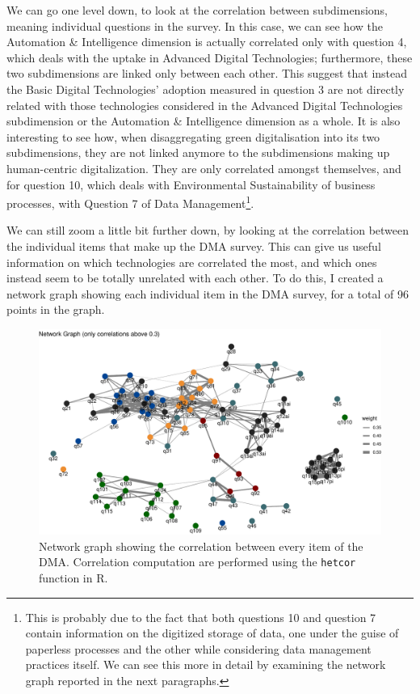 \documentclass[12pt]{report}
\begin{document}
\par We can go one level down, to look at the correlation between subdimensions, meaning individual questions in the survey. In this case, we can see how the Automation \& Intelligence dimension is actually correlated only with question 4, which deals with the uptake in Advanced Digital Technologies; furthermore, these two subdimensions are linked only between each other. This suggest that instead the Basic Digital Technologies' adoption measured in question 3 are not directly related with those technologies considered in the Advanced Digital Technologies subdimension or the Automation \& Intelligence dimension as a whole. It is also interesting to see how, when disaggregating green digitalisation into its two subdimensions, they are not linked anymore to the subdimensions making up human-centric digitalization. They are only correlated amongst themselves, and for question 10, which deals with Environmental Sustainability of business processes, with Question 7 of Data Management\footnote{This is probably due to the fact that both questions 10 and question 7 contain information on the digitized storage of data, one under the guise of paperless processes and the other while considering data management practices itself. We can see this more in detail by examining the network graph reported in the next paragraphs.}.

\par We can still zoom a little bit further down, by looking at the correlation between the individual items that make up the DMA survey. This can give us useful information on which technologies are correlated the most, and which ones instead seem to be totally unrelated with each other. To do this, I created a network graph showing each individual item in the DMA survey, for a total of 96 points in the graph.



\begin{figure}[h!]
    \centering
    \includegraphics[width=0.8\linewidth]{../Output/network_graph.pdf}
    \caption{\centering Network graph showing the correlation between every item of the DMA. Correlation computation are performed using the \texttt{hetcor} function in R.}
    \label{fig:network_graph}
\end{figure}
\end{document}

